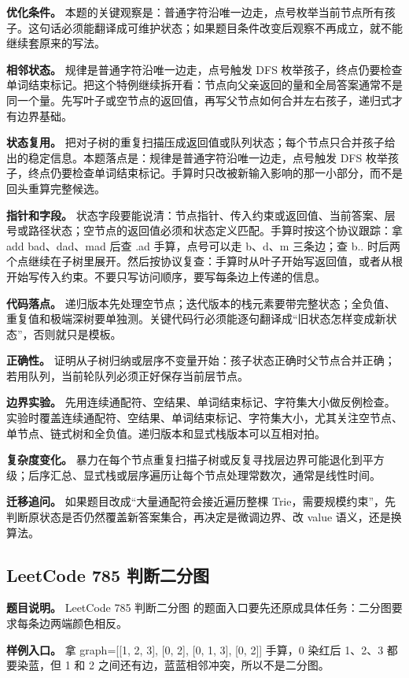 \textbf{优化条件。} 本题的关键观察是：普通字符沿唯一边走，点号枚举当前节点所有孩子。这句话必须能翻译成可维护状态；如果题目条件改变后观察不再成立，就不能继续套原来的写法。

\textbf{相邻状态。} 规律是普通字符沿唯一边走，点号触发 DFS 枚举孩子，终点仍要检查单词结束标记。把这个特例继续拆开看：节点向父亲返回的量和全局答案通常不是同一个量。先写叶子或空节点的返回值，再写父节点如何合并左右孩子，递归式才有边界基础。

\textbf{状态复用。} 把对子树的重复扫描压成返回值或队列状态；每个节点只合并孩子给出的稳定信息。本题落点是：规律是普通字符沿唯一边走，点号触发 DFS 枚举孩子，终点仍要检查单词结束标记。手算时只改被新输入影响的那一小部分，而不是回头重算完整候选。

\textbf{指针和字段。} 状态字段要能说清：节点指针、传入约束或返回值、当前答案、层号或路径状态；空节点的返回值必须和状态定义匹配。手算时按这个协议跟踪：拿 add bad、dad、mad 后查 .ad 手算，点号可以走 b、d、m 三条边；查 b.. 时后两个点继续在子树里展开。然后按协议复查：手算时从叶子开始写返回值，或者从根开始写传入约束。不要只写访问顺序，要写每条边上传递的信息。

\textbf{代码落点。} 递归版本先处理空节点；迭代版本的栈元素要带完整状态；全负值、重复值和极端深树要单独测。关键代码行必须能逐句翻译成“旧状态怎样变成新状态”，否则就只是模板。

\textbf{正确性。} 证明从子树归纳或层序不变量开始：孩子状态正确时父节点合并正确；若用队列，当前轮队列必须正好保存当前层节点。

\textbf{边界实验。} 先用连续通配符、空结果、单词结束标记、字符集大小做反例检查。实验时覆盖连续通配符、空结果、单词结束标记、字符集大小，尤其关注空节点、单节点、链式树和全负值。递归版本和显式栈版本可以互相对拍。

\textbf{复杂度变化。} 暴力在每个节点重复扫描子树或反复寻找层边界可能退化到平方级；后序汇总、显式栈或层序遍历让每个节点处理常数次，通常是线性时间。

\textbf{迁移追问。} 如果题目改成“大量通配符会接近遍历整棵 Trie，需要规模约束”，先判断原状态是否仍然覆盖新答案集合，再决定是微调边界、改 value 语义，还是换算法。

\subsection{LeetCode 785 判断二分图}

\textbf{题目说明。} LeetCode 785 判断二分图 的题面入口要先还原成具体任务：二分图要求每条边两端颜色相反。

\textbf{样例入口。} 拿 graph=[[1, 2, 3], [0, 2], [0, 1, 3], [0, 2]] 手算，0 染红后 1、2、3 都要染蓝，但 1 和 2 之间还有边，蓝蓝相邻冲突，所以不是二分图。

